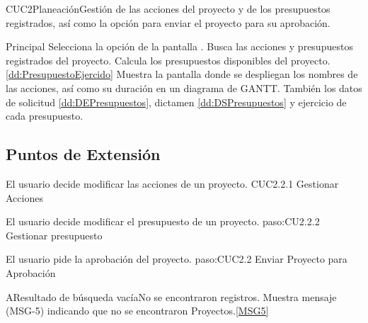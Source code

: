 
  \begin{UseCase}{CUC2}{Planeación}{Gestión de las acciones del proyecto y de los presupuestos registrados, así como la opción para enviar el proyecto para su aprobación.}
  \end{UseCase}

  \begin{UCtrayectoria}{Principal}
    \UCpaso[\UCactor] Selecciona la opción  de la pantalla .
    \UCpaso Busca las acciones y presupuestos registrados del proyecto. \label{paso:CUC2.planeacion}
    \UCpaso Calcula los presupuestos disponibles del proyecto.  \ref{dd:PresupuestoEjercido}  %
    \UCpaso Muestra la pantalla  donde se despliegan los nombres de las acciones, así como su duración en un diagrama de GANTT. También los datos de solicitud \ref{dd:DEPresupuestos}, dictamen \ref{dd:DSPresupuestos} y ejercicio de cada presupuesto.
  \end{UCtrayectoria}

\subsection{Puntos de Extensión}
	{El usuario decide modificar las acciones de un proyecto.}
	{CUC2.2.1 Gestionar Acciones}
	{}

	{El usuario decide modificar el presupuesto de un proyecto.}
	{paso:CU2.2.2 Gestionar presupuesto}
	{}

	{El usuario pide la aprobación del proyecto.}
	{paso:CUC2.2 Enviar Proyecto para Aprobación}
	{}

  \begin{UCtrayectoriaA}{A}{Resultado de búsqueda vacía}{No se encontraron registros.}
    \UCpaso Muestra mensaje (MSG-5) indicando que no se encontraron Proyectos.\ref{MSG5}
  \end{UCtrayectoriaA}

